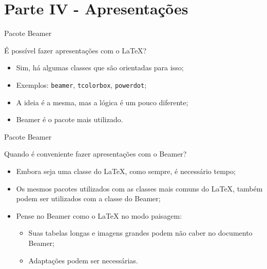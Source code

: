 \documentclass[10pt]{beamer}
\begin{document}
\section{Parte IV - Apresentações}

\begin{frame}{Pacote Beamer}
	\begin{block}{É possível fazer apresentações com o \LaTeX{}?}
		\begin{itemize}
			\pause
			\item Sim, há algumas classes que são orientadas para isso;
			\pause
			\item Exemplos: {\tt beamer}, {\tt tcolorbox}, {\tt powerdot};
			\pause
			\item A ideia é a mesma, mas a lógica é um pouco diferente;
			\pause
			\item Beamer é o pacote mais utilizado.
		\end{itemize}
	\end{block}
\end{frame}

\begin{frame}{Pacote Beamer}
	\begin{block}{Quando é conveniente fazer apresentações com o Beamer?}
		\begin{itemize}
			\pause
			\item Embora seja uma classe do \LaTeX{}, como sempre, é necessário tempo;
			\pause
			\item Os mesmos pacotes utilizados com as classes mais comuns do \LaTeX{}, também podem ser utilizados com a classe do Beamer;
			\pause
			\item Pense no Beamer como o \LaTeX{} no modo paisagem:
			\begin{itemize}
			    \pause
			    \item Suas tabelas longas e imagens grandes podem não caber no documento Beamer;
			    \pause
			    \item Adaptações podem ser necessárias.
			\end{itemize}
		\end{itemize}
	\end{block}
\end{frame}
\end{document}
